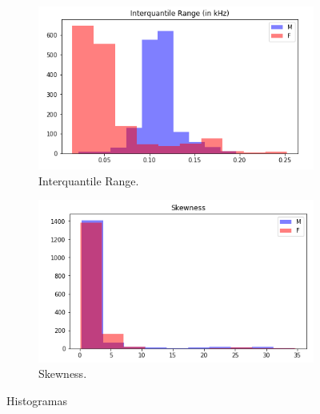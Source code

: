 \documentclass[12pt]{article}
\begin{document}
\begin{figure}[h!]
	\begin{subfigure}{0.49\linewidth}
		\centering
		\includegraphics[width=\linewidth]{images/hist_IR.png}
		\caption{Interquantile Range.}
		\label{fig:hist_ir}
	\end{subfigure}
	\begin{subfigure}{0.49\linewidth}
		\centering
		\includegraphics[width=\linewidth]{images/hist_skewness.png}
		\caption{Skewness.}
		\label{fig:hist_skewness}
	\end{subfigure}
	\caption{Histogramas}
\end{figure}

\end{document}
